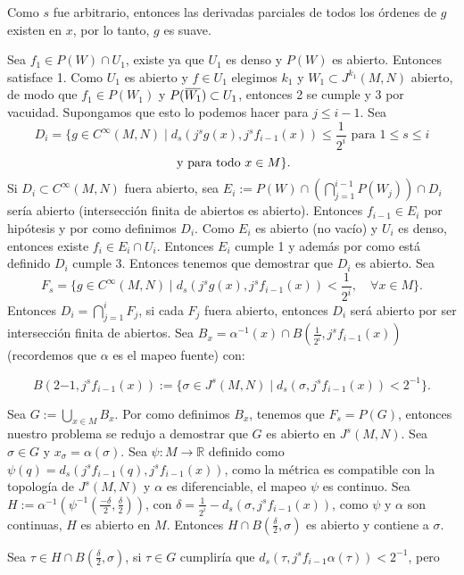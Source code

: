 \documentclass{report}
\theoremstyle{definition}
\newcommand{\overbar}[1]{\mkern 1.5mu\overline{\mkern-1.5mu#1\mkern-1.5mu}\mkern 1.5mu}
\begin{document}
Como $s$ fue arbitrario, entonces las derivadas parciales de todos los \'ordenes de $g$ existen en $x$, por lo tanto, $g$ es suave.

Sea $f_1 \in P(W) \cap U_1$, existe ya que $U_1$ es denso y $P(W)$ es abierto. Entonces satisface 1. Como $U_1$ es abierto y $f \in U_1$ elegimos $k_1$ y $W_1 \subset J^{k_1} (M,N)$ abierto, de modo que $f_1 \in P(W_1)$ y $P(\overbar{W_1}) \subset U_1$, entonces 2 se cumple y 3 por vacuidad. Supongamos que esto lo podemos hacer para $j \leq i -1$. Sea $$D_i = \{ g \in C^\infty (M,N) \mid d_s (j^s g(x), j^s f_{i-1} (x)) \leq \frac{1}{2^{i}} \text{ para } 1 \leq s \leq i $$$$\text{ y para todo }\\ x \in M \}. $$
Si $D_i \subset C^\infty (M,N)$ fuera abierto, sea $E_i := P(W) \cap (\bigcap\limits_{j=1}^{i-1} P(W_j) )\cap D_i$ ser\'ia abierto (intersecci\'on finita de abiertos es abierto). Entonces $f_{i-1} \in E_i$ por hip\'otesis y por como definimos $D_i$. Como $E_i$ es abierto (no vac\'io) y $U_i$ es denso, entonces existe $f_i \in E_i \cap U_i$. Entonces $E_i$ cumple 1 y adem\'as por como est\'a definido $D_i$ cumple 3. Entonces tenemos que demostrar que $D_i$ es abierto. Sea $$F_s =\{ g \in C^\infty (M,N) \mid d_s (j^s g(x) , j^s f_{i-1} (x) ) < \frac{1}{2^{i}}, \quad \forall x \in M \}.$$
Entonces $D_i= \bigcap\limits_{j=1}^{i} F_j$, si cada $F_j$ fuera abierto, entonces $D_i$ ser\'a abierto por ser intersecci\'on finita de abiertos. Sea $B_x = \alpha^{-1} (x) \cap B(\frac{1}{2^{i}} , j^s f_{i-1} (x))$ (recordemos que $\alpha$ es el mapeo fuente) con:

$$B( 2{-1} , j^s f_{i-1} (x)) := \{ \sigma \in J^s (M,N) \mid  d_s (\sigma , j^s f_{i-1} (x)) < 2^{-1} \} .$$

Sea $G := \bigcup\limits_{x \in M} B_x$. Por como definimos $B_x$, tenemos que $F_s = P(G)$, entonces nuestro problema se redujo a demostrar que $G$ es abierto en $J^s (M,N)$. Sea $\sigma \in G$ y $x_\sigma = \alpha (\sigma)$. Sea $\psi: M \to \mathbb{R}$ definido como $\psi (q) = d_s (j^s f_{i-1} (q) , j^s f_{i-1} (x) ) $, como la m\'etrica es compatible con la topolog\'ia de $J^s (M,N)$ y $\alpha$ es diferenciable, el mapeo $\psi$ es continuo. Sea $H := \alpha^{-1} ( \psi^{-1} ( \frac{- \delta}{2} , \frac{\delta}{2} ))$, con $\delta = \frac{1}{2^{i}} - d_s ( \sigma , j^s f_{i-1} (x) )$, como $\psi$ y $\alpha$ son continuas, $H$ es abierto en $M$. Entonces $H \cap B( \frac{\delta}{2} , \sigma)$ es abierto y contiene a $\sigma$.

Sea $\tau \in H \cap B(\frac{\delta}{2} , \sigma)$, si $\tau \in G$ cumplir\'ia que $d_s (\tau , j^s f_{i-1} \alpha (\tau )) < 2^{-1} $, pero
\end{document}

